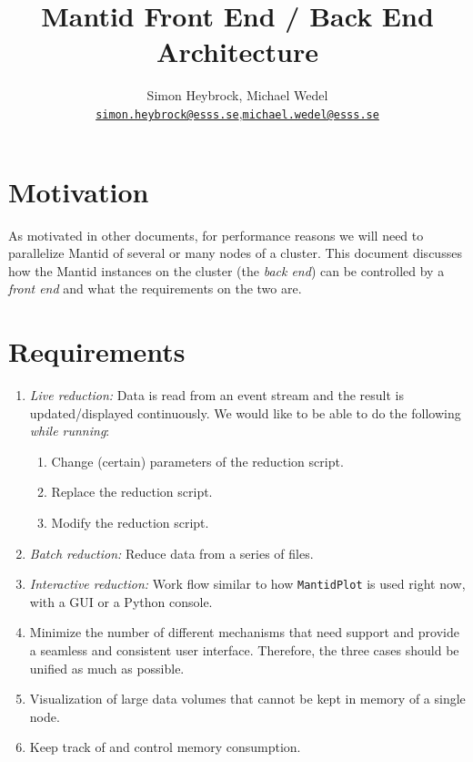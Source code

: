 \documentclass[a4paper,english,numbers=noenddot,bibliography=totoc,chapterprefix=on,DIV=12]{scrartcl}
\begin{document}
\title{Mantid Front End / Back End Architecture}
\author{Simon Heybrock, Michael Wedel\\
    {\small\href{mailto:simon.heybrock@esss.se}{\nolinkurl{simon.heybrock@esss.se}}},{\small\href{mailto:michael.wedel@esss.se}{\nolinkurl{michael.wedel@esss.se}}}}

\maketitle

\tableofcontents

\section{Motivation}

As motivated in other documents, for performance reasons we will need to parallelize Mantid of several or many nodes of a cluster.
This document discusses how the Mantid instances on the cluster (the \emph{back end}) can be controlled by a \emph{front end} and what the requirements on the two are.

\section{Requirements}

\begin{enumerate}
  \item \emph{Live reduction:} Data is read from an event stream and the result is updated/displayed continuously.
    We would like to be able to do the following \emph{while running}:
    \begin{enumerate}
      \item Change (certain) parameters of the reduction script.
      \item Replace the reduction script.
      \item Modify the reduction script.
    \end{enumerate}
  \item \emph{Batch reduction:} Reduce data from a series of files.
  \item \emph{Interactive reduction:} Work flow similar to how \texttt{MantidPlot} is used right now, with a GUI or a Python console.
  \item Minimize the number of different mechanisms that need support and provide a seamless and consistent user interface.
    Therefore, the three cases should be unified as much as possible.
  \item Visualization of large data volumes that cannot be kept in memory of a single node.
  \item Keep track of and control memory consumption.
\end{enumerate}
\end{document}

